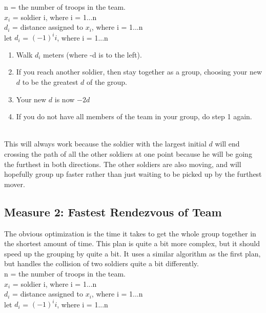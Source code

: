 \documentclass[a4paper,12pt]{article}
\begin{document}
\noindent n = the number of troops in the team.\\
\(x_i\) = soldier i, where i = 1...n \\
\(d_i\) = distance assigned to \(x_i\), where i = 1...n \\
let \(d_i\) = \((-1)^{i}i\), where i = 1...n \\

\begin{enumerate}
\item Walk \(d_i\) meters (where -d is to the left).
\item If you reach another soldier, then stay together as a group, choosing your new \(d\) to be
the greatest \(d\) of the group.
\item Your new \(d\) is now \(-2d\)
\item If you do not have all members of the team in your group, do step 1 again. 
\end{enumerate}

 \\
This will always work because the soldier with the largest initial
\(d\) will end crossing the path of all the other soldiers at one
point because he will be going the furthest in both directions. The
other soldiers are also moving, and will hopefully group up faster
rather than just waiting to be picked up by the furthest mover.

\subsection{Measure 2: Fastest Rendezvous of Team}
The obvious optimization is the time it takes to get the whole group
together in the shortest amount of time. This plan is quite a bit more
complex, but it should speed up the grouping by quite a bit. It uses a
similar algorithm as the first plan, but handles the collision of two
soldiers quite a
bit differently. \\

\noindent n = the number of troops in the team.\\
\(x_i\) = soldier i, where i = 1...n \\
\(d_i\) = distance assigned to \(x_i\), where i = 1...n \\
let \(d_i\) = \((-1)^{i}i\), where i = 1...n \\
\end{document}
